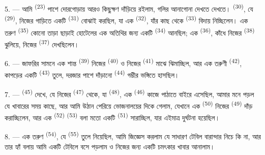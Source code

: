 5. --- আমি  \textsuperscript{(23)} পাশে দোরগোড়ায় আরও
কিছুক্ষণ দাঁড়িয়ে রইলাম, গলির আনাগোনা দেখতে দেখতে। 
\textsuperscript{(30)}, যে  \textsuperscript{(29)}, নিজের
গাড়িতে একটি  \textsuperscript{(31)} বোঝাই করছিল, যা এক
 \textsuperscript{(32)}, যাঁর কাছ থেকে 
\textsuperscript{(33)} বিদায় নিচ্ছিলেন। এক তরুণ 
\textsuperscript{(35)} কোনো তাড়া ছাড়াই হোটেলের এক অতিথির জন্য একটি
 \textsuperscript{(34)} আনছিল; এক 
\textsuperscript{(36)}, কাঁধে নিজের  \textsuperscript{(38)}
ঝুলিয়ে, নিজের  \textsuperscript{(37)} দেখছিলেন।

\VUsaut{4.0mm}
\VUsaut{3.0mm}

6. --- জাফরির সামনে এক শান্ত  \textsuperscript{(39)} নিজের
 \textsuperscript{(40)} ও নিজের  \textsuperscript{(41)} মাঝে ঝিমাচ্ছিল, আর এক তরুণী 
\textsuperscript{(42)}, কাপড়ের একটি  \textsuperscript{(43)} তুলে,
দরজার পাশে দাঁড়ানো  \textsuperscript{(44)} গম্ভীর
ভঙ্গিতে হাসছিল।

7. ---  \textsuperscript{(45)} দেখে, যে নিজের 
\textsuperscript{(47)} থেকে, যা  \textsuperscript{(48)}, এক
 \textsuperscript{(46)} কাজে পাঠাতে বাইরে এসেছিল,
আমার মনে পড়ল যে খাবারের সময় কাছে, আর আমি উঠান পেরিয়ে ভোজনালয়ের দিকে গেলাম,
যেখানে এক  \textsuperscript{(50)} নিজের 
\textsuperscript{(49)} দাঁড় করাচ্ছিলেন, আর এক 
\textsuperscript{(52)}  \textsuperscript{(53)} বলা মতো একটি
 \textsuperscript{(51)} সারাচ্ছিল, যার এইমাত্র দুর্ঘটনা
হয়েছিল।

8. --- এক তরুণ  \textsuperscript{(54)}, যে  \textsuperscript{(55)} তুলে নিয়েছিল, আমি জিজ্ঞেস করলাম যে সাধারণ টেবিল
বারান্দার নিচে কি না, আর তার হ্যাঁ বলায় আমি একটি টেবিলে বসে পড়লাম ও নিজের
জন্য একটি চমৎকার খাবার আনালাম।


\VUsaut{4.0mm}
\VUsaut{3.0mm}

